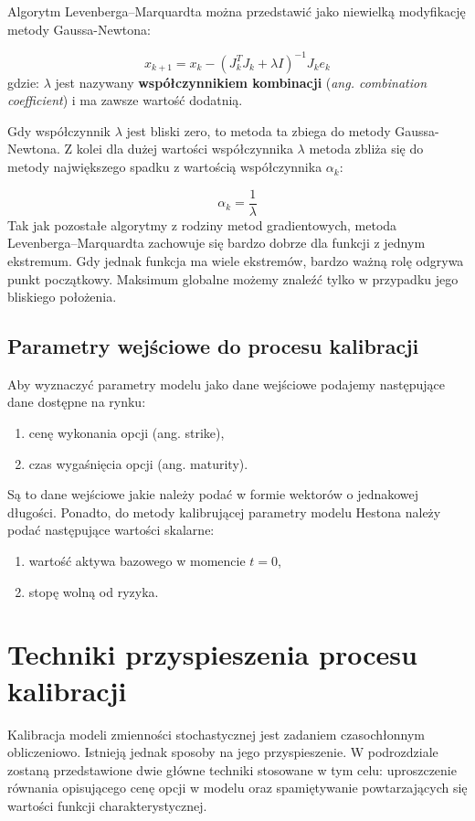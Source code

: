 \documentclass{pracamgr}
\begin{document}
Algorytm Levenberga–Marquardta można przedstawić jako niewielką modyfikację metody Gaussa-Newtona:


\begin{equation} 
  x_{k+1} = x_k - (J_k^TJ_k + \lambda I)^{-1}J_k e_k
\end{equation}
gdzie: $\lambda$ jest nazywany 
\textbf{współczynnikiem kombinacji} (\textit{ang. combination coefficient}) i 
ma zawsze wartość dodatnią.

Gdy współczynnik $\lambda$ jest bliski zero, to metoda ta zbiega do metody Gaussa-Newtona. 
Z kolei dla dużej wartości współczynnika $\lambda$ metoda zbliża się do metody największego spadku
z wartością współczynnika $\alpha_k$:

\begin{equation}
  \alpha_k = \frac{1}{\lambda}
\end{equation}
Tak jak pozostałe algorytmy z rodziny metod gradientowych, metoda Levenberga–Marquardta zachowuje się
bardzo dobrze dla funkcji z jednym ekstremum. Gdy jednak funkcja ma wiele ekstremów, bardzo ważną
rolę odgrywa punkt początkowy. Maksimum globalne możemy znaleźć tylko w przypadku jego bliskiego
położenia.



\subsection{Parametry wejściowe do procesu kalibracji}

Aby wyznaczyć parametry modelu jako dane wejściowe podajemy następujące dane dostępne na rynku:
\begin{enumerate}
  \item cenę wykonania opcji (ang. strike),
  \item czas wygaśnięcia opcji (ang. maturity).
\end{enumerate}
Są to dane wejściowe jakie należy podać w formie wektorów o jednakowej długości.
Ponadto, do metody kalibrującej parametry modelu Hestona należy podać następujące 
wartości skalarne:
\begin{enumerate}
  \item wartość aktywa bazowego w momencie $t=0$,
  \item stopę wolną od ryzyka.
\end{enumerate}

\section{Techniki przyspieszenia procesu kalibracji} %
Kalibracja modeli zmienności stochastycznej jest zadaniem czasochłonnym obliczeniowo. 
Istnieją jednak sposoby na jego przyspieszenie. W podrozdziale zostaną przedstawione 
dwie główne techniki stosowane w tym celu: uproszczenie równania opisującego cenę opcji 
w modelu oraz spamiętywanie powtarzających się wartości funkcji charakterystycznej.
\end{document}

